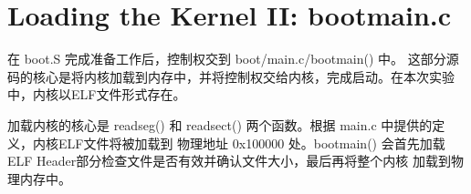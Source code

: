 \documentclass[12pt, letterpaper]{report}
\begin{document}
\section[\large Loading the Kernel II: bootmain.c]{Loading the Kernel II: bootmain.c}
{
        在 boot.S 完成准备工作后，控制权交到 boot/main.c/bootmain() 中。
        这部分源码的核心是将内核加载到内存中，并将控制权交给内核，完成启动。在本次实验中，内核以ELF文件形式存在。\par 
        加载内核的核心是 readseg() 和 readsect() 两个函数。根据 main.c 中提供的定义，内核ELF文件将被加载到
        物理地址 0x100000 处。bootmain() 会首先加载ELF Header部分检查文件是否有效并确认文件大小，最后再将整个内核
        加载到物理内存中。
} \par 

\quad \par 
\end{document}
